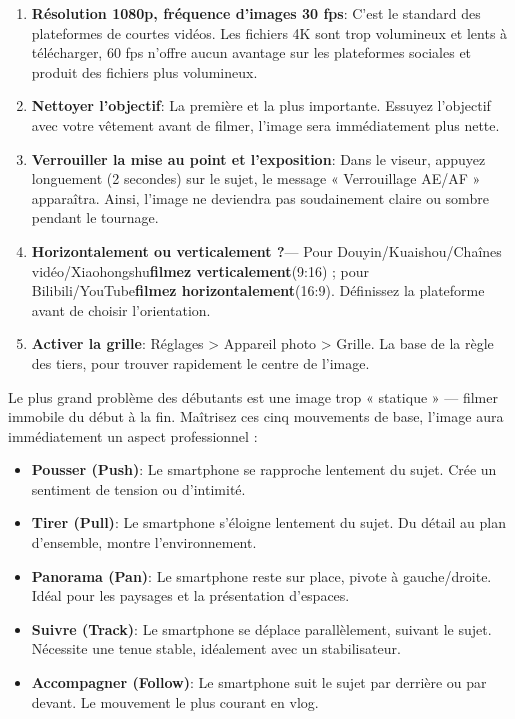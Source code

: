 \begin{enumerate}
  \item \textbf{Résolution 1080p, fréquence d'images 30 fps}: C'est le standard des plateformes de courtes vidéos. Les fichiers 4K sont trop volumineux et lents à télécharger, 60 fps n'offre aucun avantage sur les plateformes sociales et produit des fichiers plus volumineux.
  \item \textbf{Nettoyer l'objectif}: La première et la plus importante. Essuyez l'objectif avec votre vêtement avant de filmer, l'image sera immédiatement plus nette.
  \item \textbf{Verrouiller la mise au point et l'exposition}: Dans le viseur, appuyez longuement (2 secondes) sur le sujet, le message « Verrouillage AE/AF » apparaîtra. Ainsi, l'image ne deviendra pas soudainement claire ou sombre pendant le tournage.
  \item \textbf{Horizontalement ou verticalement ?}— Pour Douyin/Kuaishou/Chaînes vidéo/Xiaohongshu\textbf{filmez verticalement}(9:16) ; pour Bilibili/YouTube\textbf{filmez horizontalement}(16:9). Définissez la plateforme avant de choisir l'orientation.
  \item \textbf{Activer la grille}: Réglages > Appareil photo > Grille. La base de la règle des tiers, pour trouver rapidement le centre de l'image.
\end{enumerate}


Le plus grand problème des débutants est une image trop « statique » — filmer immobile du début à la fin. Maîtrisez ces cinq mouvements de base, l'image aura immédiatement un aspect professionnel :

\begin{itemize}
  \item \textbf{Pousser (Push)}: Le smartphone se rapproche lentement du sujet. Crée un sentiment de tension ou d'intimité.
  \item \textbf{Tirer (Pull)}: Le smartphone s'éloigne lentement du sujet. Du détail au plan d'ensemble, montre l'environnement.
  \item \textbf{Panorama (Pan)}: Le smartphone reste sur place, pivote à gauche/droite. Idéal pour les paysages et la présentation d'espaces.
  \item \textbf{Suivre (Track)}: Le smartphone se déplace parallèlement, suivant le sujet. Nécessite une tenue stable, idéalement avec un stabilisateur.
  \item \textbf{Accompagner (Follow)}: Le smartphone suit le sujet par derrière ou par devant. Le mouvement le plus courant en vlog.
\end{itemize}


